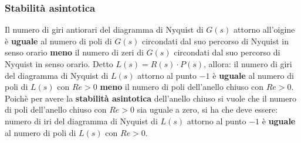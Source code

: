 \begin{landscape}
    \subsubsection*{Stabilità asintotica}
    Il numero di giri antiorari del diagramma di Nyquist di $G(s)$ attorno all'oigine è \textbf{uguale} al numero di poli di $G(s)$ circondati dal suo percorso di Nyquist in senso orario \textbf{meno} il numero di zeri di $G(s)$ circondati dal suo percorso di Nyquist in senso orario.\newline
    \newline
    Detto $L(s) = R(s) \cdot P(s)$, allora:\newline
    il numero di giri del diagramma di Nyquist di $L(s)$ attorno al punto $-1$ è \textbf{uguale} al numero di poli di $L(s)$ con $Re> 0$ \textbf{meno} il numero di poli dell'anello chiuso con $Re > 0$.\newline
    \newline
    Poichè per avere la \textbf{stabilità asintotica} dell'anello chiuso si vuole che il numero di poli dell'anello chiuso con $Re > 0$ sia uguale a zero, si ha che deve essere:\newline
    numero di iri del diagramma di Nyquist di $L(s)$ attorno al punto $-1$ è \textbf{uguale} al numero di poli di $L(s)$ con $Re > 0$.

\end{landscape}
